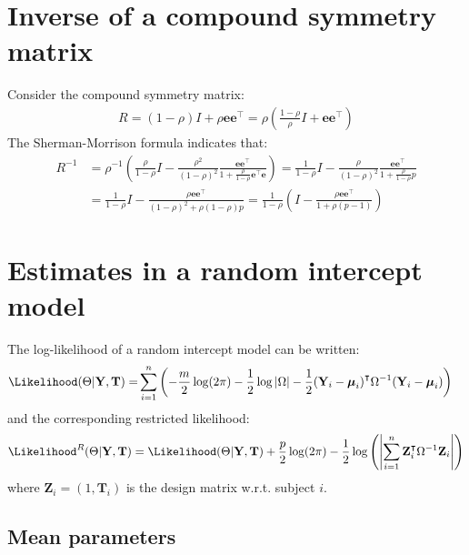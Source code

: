 \documentclass[12pt]{article}
\newcommand\Ve{\mathbf{e}}
\newcommand\VT{\mathbf{T}}
\newcommand\VY{\mathbf{Y}}
\newcommand\VZ{\mathbf{Z}}
\newcommand\Vmu{\boldsymbol{\mu}}
\newcommand\trans[1]{{#1}^\intercal}%
\begin{document}
\section{Inverse of a compound symmetry matrix}
\label{sm:invCS}
Consider the compound symmetry matrix:
\begin{align*}
R= (1-\rho) I + \rho \Ve\trans{\Ve}= \rho\left(\frac{1-\rho}{\rho} I + \Ve\trans{\Ve}\right) 
\end{align*}
The Sherman-Morrison formula indicates that:
\begin{align*}
R^{-1} &= \rho^{-1} \left(\frac{\rho}{1-\rho} I - \frac{\rho^2}{(1-\rho)^2}\frac{\Ve\trans{\Ve}}{1+\frac{\rho}{1-\rho}\trans{\Ve}\Ve}\right) = \frac{1}{1-\rho} I - \frac{\rho}{(1-\rho)^2}\frac{\Ve\trans{\Ve}}{1+\frac{\rho}{1-\rho}p} \\
&=  \frac{1}{1-\rho} I - \frac{\rho \Ve\trans{\Ve}}{(1-\rho)^2+\rho(1-\rho)p} =  \frac{1}{1-\rho} \left(I - \frac{\rho \Ve\trans{\Ve}}{1+\rho(p-1)}\right)
\end{align*}

\section{Estimates in a random intercept model}
\label{sm:rhoML}
The log-likelihood of a random intercept model can be written:
\begin{align*}
\Likelihood(\Theta|\VY,\VT) =& \sum_{i=1}^{n} \left(-\frac{m}{2} \log(2\pi) - \frac{1}{2} \log\left|\Omega\right| - \frac{1}{2} \trans{(\VY_i-\Vmu_i)} \Omega^{-1} (\VY_i-\Vmu_i) \right)
\end{align*}
and the corresponding restricted likelihood:
\begin{align*}
\Likelihood^R(\Theta|\VY,\VT) = \Likelihood(\Theta|\VY,\VT) + \frac{p}{2} \log(2\pi)-\frac{1}{2} \log\left(\left|\sum_{i=1}^n \trans{\VZ}_i \Omega^{-1} \VZ_i \right|\right)
\end{align*}
where \(\VZ_i = (1,\VT_i)\) is the design matrix w.r.t. subject \(i\).


\subsection{Mean parameters}
\label{sec:orgbad81f4}
\end{document}

